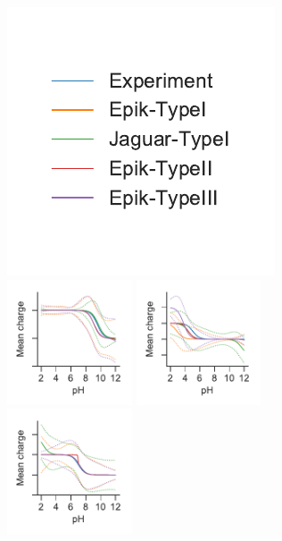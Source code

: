 \documentclass[9pt,lineno,final]{elife}
\begin{document}
    
\begin{figure}[H]
	\centering
	\includegraphics[]{Reports/overview-legend-SM01.pdf}	\\
	\includegraphics[width=0.33\textwidth]{Reports/overview-virtual-titration-SM01.pdf}
	\includegraphics[width=0.33\textwidth]{Reports/overview-virtual-titration-SM02.pdf}
	\includegraphics[width=0.33\textwidth]{Reports/overview-virtual-titration-SM03.pdf}	 \\

\end{figure}
\end{document}

